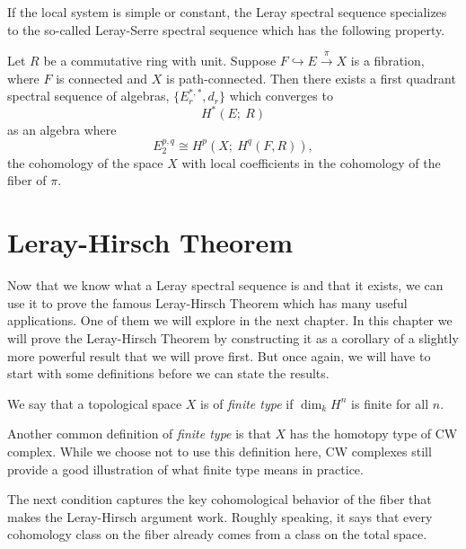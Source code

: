\documentclass[11pt]{amsart}
\begin{document}
If the local system is simple or constant, the Leray spectral sequence specializes to the so-called Leray-Serre spectral sequence which has the following property.

\begin{theorem}
    Let $R$ be a commutative ring with unit.
    Suppose $F\hookrightarrow E \overset{\pi}{\to} X$ is a fibration, where $F$ is connected and $X$ is path-connected. Then there exists a first quadrant spectral sequence of algebras, $\{E_r^{*,*}, d_r\}$ which converges to 
    \begin{equation*}
        H^*(E;\ R)
    \end{equation*}
    as an algebra where
    \begin{equation*}
        E^{p,q}_2\cong H^p(X; \ H^q(F, R)),
    \end{equation*}
    the cohomology of the space $X$ with local coefficients in the cohomology of the fiber of $\pi$.
\end{theorem}





\section{Leray-Hirsch  Theorem }
Now that we know what a Leray spectral sequence is and that it exists, we can use it to prove the famous Leray-Hirsch Theorem which has many useful applications. One of them we will explore in the next chapter. In this chapter we will prove the Leray-Hirsch Theorem by constructing it as a corollary of a slightly more powerful result that we will prove first. But once again, we will have to start with some definitions before we can state the results.
\begin{definition}
    We say that a topological space $X$ is of \textit{finite type} if $\dim_k H^n$ is finite for all $n$.
\end{definition}
\begin{example}
     Another common definition of \textit{finite type} is that $X$ has the homotopy type of  CW complex. While we choose not to use this definition here, CW complexes still provide a good illustration of what finite type means in practice.
\end{example}


The next condition captures the key cohomological behavior of the fiber that makes the Leray-Hirsch argument work. Roughly speaking, it says that every cohomology class on the fiber already comes from a class on the total space.
\end{document}
